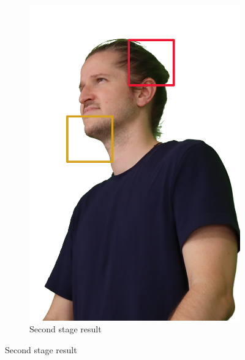 \begin{figure}[h]
\begin{subfigure}{0.4\linewidth}
		\includegraphics[width=\textwidth]{Figures/processed/clean_6-B-6-2-163452-598.png}
		\caption{Second stage result}
		\label{fig:second_stage}
	\end{subfigure}
	\vfil


\end{figure}
